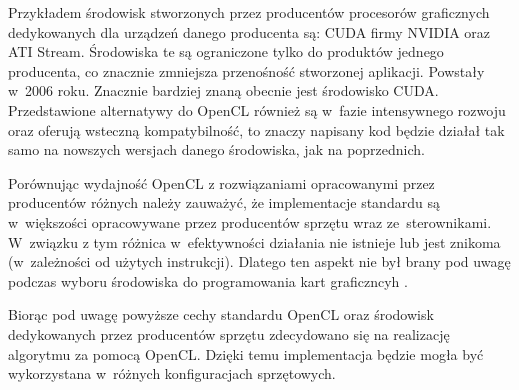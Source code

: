Przykładem środowisk stworzonych przez producentów procesorów graficznych dedykowanych dla urządzeń danego producenta są: CUDA firmy NVIDIA oraz ATI Stream. Środowiska te są ograniczone tylko do produktów jednego producenta, co znacznie zmniejsza przenośność stworzonej aplikacji. Powstały w~2006 roku. Znacznie bardziej znaną obecnie jest środowisko CUDA. Przedstawione alternatywy do OpenCL również są w~fazie intensywnego rozwoju oraz oferują wsteczną kompatybilność, to znaczy napisany kod będzie działał tak samo na nowszych wersjach danego środowiska, jak na poprzednich.

Porównując wydajność OpenCL z rozwiązaniami opracowanymi przez producentów różnych należy zauważyć, że implementacje standardu są w~większości opracowywane przez producentów sprzętu wraz ze~sterownikami. W~związku z tym różnica w~efektywności działania nie istnieje lub jest znikoma (w~zależności od użytych instrukcji)\cite{FromCudaToOpenCL}. Dlatego ten aspekt nie był brany pod uwagę podczas wyboru środowiska do programowania kart graficzncyh .

Biorąc pod uwagę powyższe cechy standardu OpenCL oraz środowisk dedykowanych przez producentów sprzętu zdecydowano się na realizację algorytmu za pomocą OpenCL. Dzięki temu implementacja będzie mogła być wykorzystana w~różnych konfiguracjach sprzętowych.

